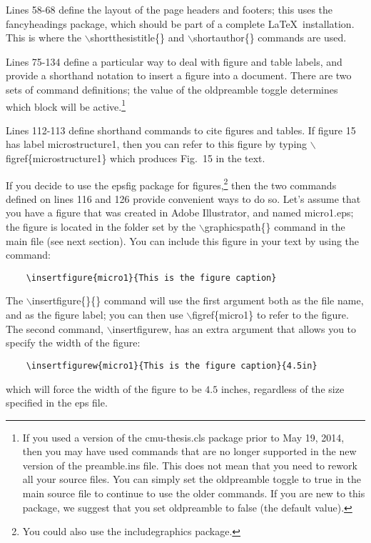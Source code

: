 \documentclass[DIV=calc, paper=letter, fontsize=11pt]{scrartcl}	 %
\newcommand{\la}[2]{\textsf{$\backslash$#1}\{#2\}}
\newcommand{\lb}[1]{\textsf{$\backslash$#1}}
\newcommand{\lc}[3]{\textsf{$\backslash$#1}\{#2\}\{#3\}}
\begin{document}
Lines 58-68 define the layout of the page headers and footers; this uses the \textsf{fancyheadings} package, which should be part 
of a complete \LaTeX\ installation.  This is where the \la{shortthesistitle}{} and \la{shortauthor}{} commands are used.

Lines 75-134 define a particular way to deal with figure and table labels, and provide a shorthand notation to insert 
a figure into a document.  There are two sets of command definitions; the value of the \textsf{oldpreamble} toggle determines
which block will be active.\footnote{If you used a version of the \textsf{cmu-thesis.cls} package prior to May 19, 2014, then 
you may have used commands that are no longer supported in the new version of the \textsf{preamble.ins} file. This does not
mean that you need to rework all your source files.  You can simply set the \textsf{oldpreamble} toggle to true in the main
source file to continue to use the older commands.  If you are new to this package, we suggest that you set \textsf{oldpreamble}
to false (the default value).}
 
Lines 112-113 define shorthand commands to cite figures and tables.  If figure 15 has label \textsf{microstructure1}, then you 
can refer to this figure by typing \la{figref}{microstructure1} which produces Fig.~15 in the text.  

If you decide to use the \textsf{epsfig} package for figures,\footnote{You could also use the \textsf{includegraphics} package.}
then the two commands defined on lines 116 and 126 provide convenient ways to do so.  Let's assume that you have a figure
that was created in Adobe Illustrator, and named \textsf{micro1.eps}; the figure is located in the folder set by the \la{graphicspath}{}
command in the main file (see next section).  You can include this figure in your text by using the command:
\begin{verbatim}
	\insertfigure{micro1}{This is the figure caption}
\end{verbatim}
The \lc{insertfigure}{}{} command will use the first argument both as the file name, and as the figure label; you can then use \la{figref}{micro1} to
refer to the figure.  The second command, \lb{insertfigurew}, has an extra argument that allows you to specify the width of the figure:
\begin{verbatim}
	\insertfigurew{micro1}{This is the figure caption}{4.5in}
\end{verbatim}
which will force the width of the figure to be $4.5$ inches, regardless of the size specified in the eps file.
\end{document}

